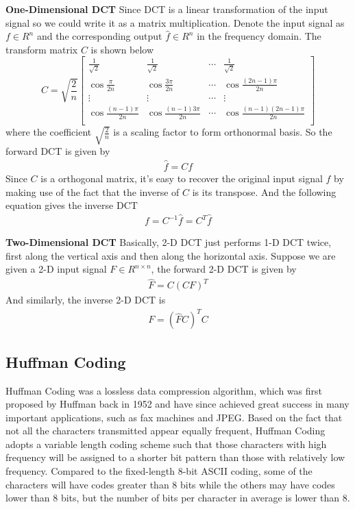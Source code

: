 \documentclass[11pt]{article}
\begin{document}
\textbf{One-Dimensional DCT} Since DCT is a linear transformation of the input signal so we could write it as a matrix multiplication. Denote the input signal as $f\in R^{n}$ and the corresponding output $\hat{f}\in R^n$ in the frequency domain. The transform matrix $C$ is shown below
\begin{equation}
C = \sqrt{\frac{2}{n}}\begin{bmatrix}
\frac{1}{\sqrt{2}} & \frac{1}{\sqrt{2}} & \cdots & \frac{1}{\sqrt{2}} \\
\cos\frac{\pi}{2n} & \cos\frac{3\pi}{2n}  & \cdots & \cos\frac{(2n-1)\pi}{2n}  \\
\vdots & \vdots & \cdots& \vdots \\
\cos\frac{(n-1)\pi}{2n} & \cos\frac{(n-1)3\pi}{2n}  & \cdots & \cos\frac{(n-1)(2n-1)\pi}{2n}  \\
\end{bmatrix}
\end{equation}
where the coefficient $\sqrt{\frac{2}{n}}$ is a scaling factor to form orthonormal basis. So the forward DCT is given by
\begin{align}
\hat{f} = Cf
\end{align}
Since $C$ is a orthogonal matrix, it's easy to recover the original input signal $f$ by making use of the fact that the inverse of $C$ is its transpose. And the following equation gives the inverse DCT
\begin{align}
f = C^{-1}\hat{f}=C^T\hat{f}
\end{align}

\textbf{Two-Dimensional DCT} Basically, 2-D DCT just performs 1-D DCT twice, first along the vertical axis and then along the horizontal axis. Suppose we are given a 2-D input signal $F\in R^{n\times n}$, the forward 2-D DCT is given by
\begin{align}
\hat{F} = C(CF)^T
\end{align}
And similarly, the inverse 2-D DCT is
\begin{align}
F = (\hat{F}C)^TC
\end{align}
\subsection{Huffman Coding}
Huffman Coding was a lossless data compression algorithm, which was first proposed by Huffman back in 1952 \cite{c03} and have since achieved great success in many important applications, such as fax machines and JPEG. Based on the fact that not all the characters transmitted appear equally frequent, Huffman Coding adopts a variable length coding scheme such that those characters with high frequency will be assigned to a  shorter bit pattern than those with relatively low frequency. Compared to the fixed-length 8-bit ASCII coding, some of the characters will have codes greater than 8 bits while the others may have codes lower than 8 bits, but the number of bits per character in average is lower than 8.
\end{document}

